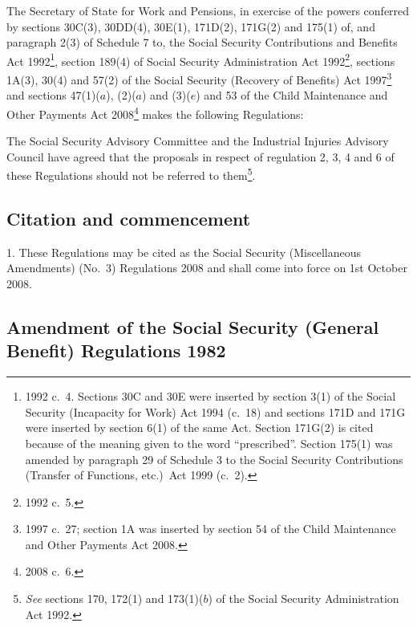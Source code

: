 \documentclass[12pt,a4paper]{article}
\title{\regstitle}
\author{S.I.\ 2008 No.\ 2365}
\date{Made
4th September 2008\\
Laid before Parliament
10th September 2008\\
Coming into force
1st October 2008
}
\begin{document}
\maketitle

\enlargethispage{\baselineskip}

\noindent
The Secretary of State for Work and Pensions, in exercise of the powers conferred by sections 30C(3), 30DD(4), 30E(1), 171D(2), 171G(2) and 175(1) of, and paragraph 2(3) of Schedule 7 to, the Social Security Contributions and Benefits Act 1992\footnote{1992 c.~4. Sections 30C and 30E were inserted by section 3(1) of the Social Security (Incapacity for Work) Act 1994 (c.~18) and sections 171D and 171G were inserted by section 6(1) of the same Act. Section 171G(2) is cited because of the meaning given to the word “prescribed”. Section 175(1) was amended by paragraph 29 of Schedule 3 to the Social Security Contributions (Transfer of Functions, etc.)\ Act 1999 (c.~2).}, section 189(4) of Social Security Administration Act 1992\footnote{1992 c.~5.}, sections 1A(3), 30(4) and 57(2) of the Social Security (Recovery of Benefits) Act 1997\footnote{1997 c.~27; section 1A was inserted by section 54 of the Child Maintenance and Other Payments Act 2008.} and sections 47(1)($a$), (2)($a$)  and (3)($e$)  and 53 of the Child Maintenance and Other Payments Act 2008\footnote{2008 c.~6.} makes the following Regulations:

The Social Security Advisory Committee and the Industrial Injuries Advisory Council have agreed that the proposals in respect of regulation 2, 3, 4 and 6 of these Regulations should not be referred to them\footnote{\emph{See} sections 170, 172(1) and 173(1)($b$)  of the Social Security Administration Act 1992.}. 

{\sloppy

\tableofcontents

}

\bigskip

\setcounter{secnumdepth}{-2}

\subsection[1. Citation and commencement]{Citation and commencement}

1.  These Regulations may be cited as the Social Security (Miscellaneous Amendments) (No.~3) Regulations 2008 and shall come into force on 1st October 2008.

\subsection[2. Amendment of the Social Security (General Benefit) Regulations 1982]{Amendment of the Social Security (General Benefit) Regulations 1982}
\end{document}
